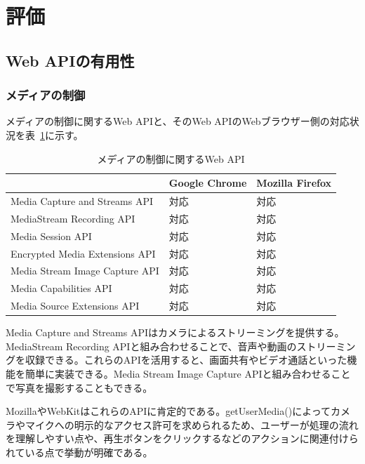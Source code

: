 \section{評価}\label{section:評価}
\subsection{Web APIの有用性}\label{subsection:PWAにおけるWeb APIの有用性}
\subsubsection{メディアの制御}\label{subsubsection:メディアの制御}
メディアの制御に関するWeb APIと、そのWeb APIのWebブラウザー側の対応状況を表~\ref{table:メディアの制御に関するWeb API}に示す。
\begin{table}
  \caption{メディアの制御に関するWeb API}\label{table:メディアの制御に関するWeb API}
  \centering
  \begin{tabular}{|p{20em}|p{10em}|p{10em}|}
    \hline
    & Google Chrome & Mozilla Firefox \\ \hline
    Media Capture and Streams API & 対応 & 対応 \\ \hline
    MediaStream Recording API & 対応 & 対応 \\ \hline
    Media Session API & 対応 & 対応 \\ \hline
    Encrypted Media Extensions API & 対応 & 対応 \\ \hline
    Media Stream Image Capture API & 対応 & 対応 \\ \hline
    Media Capabilities API & 対応 & 対応 \\ \hline
    Media Source Extensions API & 対応 & 対応 \\ \hline
  \end{tabular}
\end{table}
Media Capture and Streams APIはカメラによるストリーミングを提供する。MediaStream Recording APIと組み合わせることで、音声や動画のストリーミングを収録できる。これらのAPIを活用すると、画面共有やビデオ通話といった機能を簡単に実装できる。Media Stream Image Capture APIと組み合わせることで写真を撮影することもできる。

MozillaやWebKitはこれらのAPIに肯定的である。getUserMedia()によってカメラやマイクへの明示的なアクセス許可を求められるため、ユーザーが処理の流れを理解しやすい点や、再生ボタンをクリックするなどのアクションに関連付けられている点で挙動が明確である。
